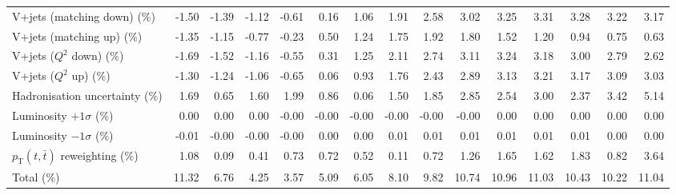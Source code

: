 \begin{table}[htbp]
{\begin{tabular}{lrrrrrrrrrrrrrr}
V+jets (matching down) (\%) & -1.50 & -1.39 & -1.12 & -0.61 & 0.16 & 1.06 & 1.91 & 2.58 & 3.02 & 3.25 & 3.31 & 3.28 & 3.22 & 3.17 \\ 
V+jets (matching up) (\%) & -1.35 & -1.15 & -0.77 & -0.23 & 0.50 & 1.24 & 1.75 & 1.92 & 1.80 & 1.52 & 1.20 & 0.94 & 0.75 & 0.63 \\ 
V+jets ($Q^{2}$ down) (\%) & -1.69 & -1.52 & -1.16 & -0.55 & 0.31 & 1.25 & 2.11 & 2.74 & 3.11 & 3.24 & 3.18 & 3.00 & 2.79 & 2.62 \\ 
V+jets ($Q^{2}$ up) (\%) & -1.30 & -1.24 & -1.06 & -0.65 & 0.06 & 0.93 & 1.76 & 2.43 & 2.89 & 3.13 & 3.21 & 3.17 & 3.09 & 3.03 \\ 
Hadronisation uncertainty (\%) & 1.69 & 0.65 & 1.60 & 1.99 & 0.86 & 0.06 & 1.50 & 1.85 & 2.85 & 2.54 & 3.00 & 2.37 & 3.42 & 5.14 \\ 
Luminosity $+1\sigma$ (\%) & 0.00 & 0.00 & 0.00 & -0.00 & -0.00 & -0.00 & -0.00 & -0.00 & -0.00 & 0.00 & 0.00 & 0.00 & 0.00 & 0.00 \\ 
Luminosity $-1\sigma$ (\%) & -0.01 & -0.00 & -0.00 & -0.00 & 0.00 & 0.00 & 0.01 & 0.01 & 0.01 & 0.01 & 0.01 & 0.01 & 0.00 & 0.00 \\ 
$p_\mathrm{T}(t,\bar{t})$ reweighting (\%) & 1.08 & 0.09 & 0.41 & 0.73 & 0.72 & 0.52 & 0.11 & 0.72 & 1.26 & 1.65 & 1.62 & 1.83 & 0.82 & 3.64 \\ 
\hline 
Total (\%) & 11.32  & 6.76  & 4.25  & 3.57  & 5.09  & 6.05  & 8.10  & 9.82  & 10.74  & 10.96  & 11.03  & 10.43  & 10.22  & 11.04 \\ 
\hline 
\end{tabular}
}
\end{table}
